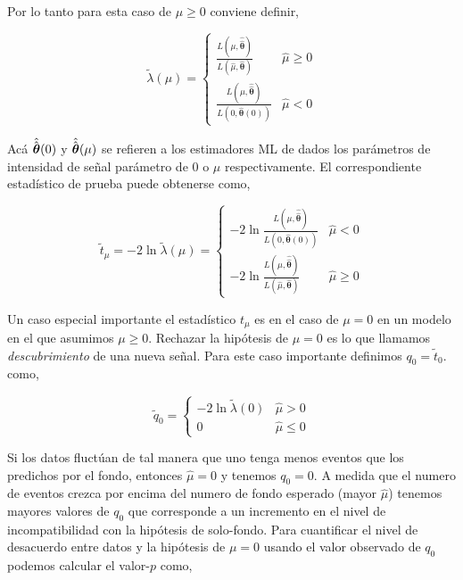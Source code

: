Por lo tanto para esta caso de $\mu \geq 0$ conviene definir,

\begin{equation}
  \tilde{\lambda}(\mu) =
  \begin{cases}
    \frac{L(\mu, \hat{\hat{\bm{\theta}}})}{L(\hat{\mu}, \hat{\bm{\theta}})} & \hat{\mu} \geq 0 \\
    \frac{L(\mu, \hat{\hat{\bm{\theta}}})}{L(0, \hat{\bm{\theta}}(0))} & \hat{\mu} < 0
  \end{cases}
\end{equation}

Acá $\hat{\hat{\bm{\theta}}}(0)$ y $\hat{\hat{\bm{\theta}}}(\mu)$ se refieren a los estimadores ML de {\btheta} dados
los parámetros de intensidad de señal parámetro de 0 o $\mu$ respectivamente. El correspondiente
estadístico de prueba puede obtenerse como,

\begin{equation}
  \tilde{t}_\mu = -2 \ln \tilde{\lambda}(\mu) =
  \begin{cases}
    -2 \ln \frac{L(\mu, \hat{\hat{\bm{\theta}}})}{L(0, \hat{\bm{\theta}}(0))} & \hat{\mu} < 0 \\
    -2 \ln \frac{L(\mu, \hat{\hat{\bm{\theta}}})}{L(\hat{\mu}, \hat{\bm{\theta}})} & \hat{\mu} \geq 0
  \end{cases}
\end{equation}


Un caso especial importante el estadístico $t_\mu$ es en el caso de $\mu=0$ en un modelo en el que
asumimos $\mu \geq 0$. Rechazar la hipótesis de $\mu=0$ es lo que llamamos \emph{descubrimiento} de
una nueva señal. Para este caso importante definimos $q_0=\tilde{t}_0$. como,

\begin{equation}
  \tilde{q}_0 =
  \begin{cases}
    -2 \ln \tilde{\lambda}(0) & \hat{\mu} > 0 \\
    0 & \hat{\mu} \leq 0
  \end{cases}
\end{equation}

Si los datos fluctúan de tal manera que uno tenga menos eventos que los predichos por
el fondo, entonces $\hat{\mu} = 0$ y tenemos $q_0=0$. A medida que el numero de eventos
crezca por encima del numero de fondo esperado (mayor $\hat{\mu}$) tenemos mayores valores
de $q_0$ que corresponde a un incremento en el nivel de incompatibilidad con la hipótesis
de solo-fondo. Para cuantificar el nivel de desacuerdo entre datos y la hipótesis de
$\mu=0$ usando el valor observado de $q_0$ podemos calcular el valor-$p$ como,

